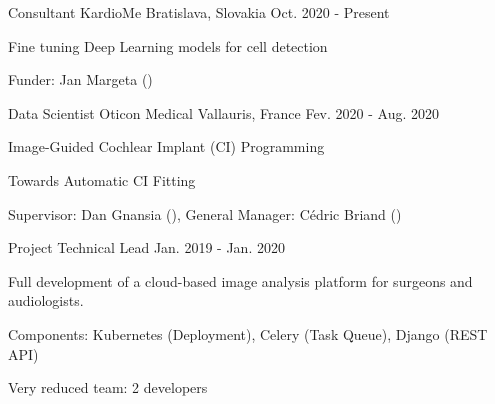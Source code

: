 

\begin{cventries}

  \cventry
    {Consultant} %
    {KardioMe} %
    {Bratislava, Slovakia} %
    {Oct. 2020 - Present} %
    {
      \begin{cvitems} %
        \item {Fine tuning Deep Learning models for cell detection}
        \item {Funder: Jan Margeta ()}
      \end{cvitems}
    }

  \cventry
    {Data Scientist} %
    {Oticon Medical} %
    {Vallauris, France} %
    {Fev. 2020 - Aug. 2020} %
    {
      \begin{cvitems} %
        \item {Image-Guided Cochlear Implant (CI) Programming \hyperlink{DDA+20}{\honordatestyle{[DDA+20]}}}
        \item {Towards Automatic CI Fitting}
        \item {Supervisor: Dan Gnansia (), General Manager: Cédric Briand ()}
      \end{cvitems}
    }

  \cventry
    {Project Technical Lead} %
    {} %
    {} %
    {Jan. 2019 - Jan. 2020} %
    {
      \begin{cvitems} %
        \item {Full development of a cloud-based image analysis platform for surgeons and audiologists. \hyperlink{DPG+19}{\honordatestyle{[DPG+19,}}\hyperlink{MM}{}\hyperlink{FR3}{}\hyperlink{NM}{}\hyperlink{UCA}{\honordatestyle{~UCA]}}}
        \item {Components: Kubernetes (Deployment), Celery (Task Queue), Django (REST API)}
        \item {Very reduced team: 2 developers}
      \end{cvitems}
    }
    

\end{cventries}
